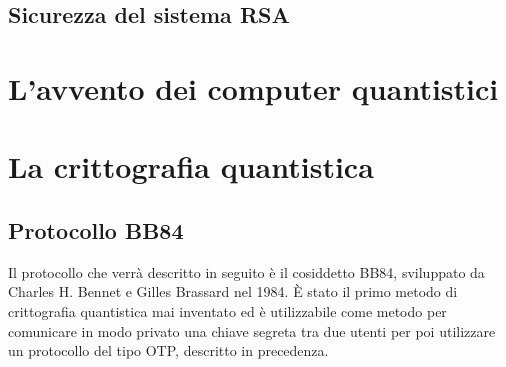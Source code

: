 \documentclass[italian,A4,12pt]{article}
\begin{document}
      \subsection{Sicurezza del sistema RSA}
  \section{L'avvento dei computer quantistici}
  \section{La crittografia quantistica}
    \subsection{Protocollo BB84}
    Il protocollo che verrà descritto in seguito è il cosiddetto BB84, sviluppato da Charles H. Bennet e Gilles Brassard nel 1984.
    È stato il primo metodo di crittografia quantistica mai inventato ed è utilizzabile come metodo per comunicare in modo privato una chiave segreta tra due utenti per poi utilizzare un protocollo del tipo OTP, descritto in precedenza.\\
\end{document}
